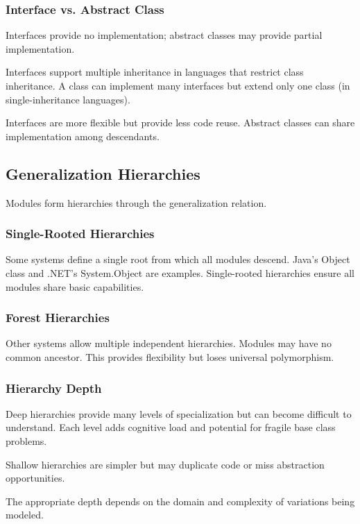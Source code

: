 \documentclass[11pt]{article}
\begin{document}
\subsubsection{Interface vs. Abstract Class}

Interfaces provide no implementation; abstract classes may provide partial implementation.

Interfaces support multiple inheritance in languages that restrict class inheritance. A class can implement many interfaces but extend only one class (in single-inheritance languages).

Interfaces are more flexible but provide less code reuse. Abstract classes can share implementation among descendants.

\subsection{Generalization Hierarchies}

Modules form hierarchies through the generalization relation.

\subsubsection{Single-Rooted Hierarchies}

Some systems define a single root from which all modules descend. Java's Object class and .NET's System.Object are examples. Single-rooted hierarchies ensure all modules share basic capabilities.

\subsubsection{Forest Hierarchies}

Other systems allow multiple independent hierarchies. Modules may have no common ancestor. This provides flexibility but loses universal polymorphism.

\subsubsection{Hierarchy Depth}

Deep hierarchies provide many levels of specialization but can become difficult to understand. Each level adds cognitive load and potential for fragile base class problems.

Shallow hierarchies are simpler but may duplicate code or miss abstraction opportunities.

The appropriate depth depends on the domain and complexity of variations being modeled.
\end{document}
